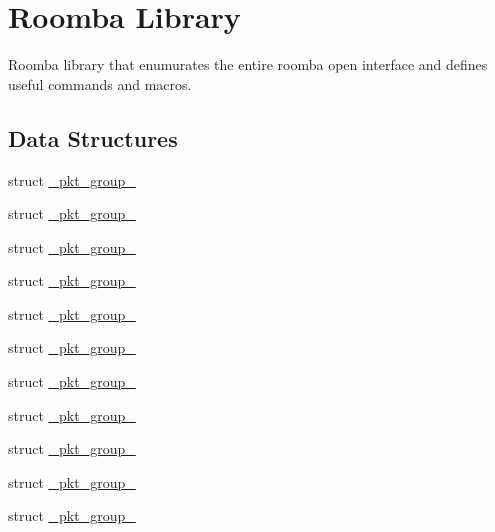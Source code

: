 \hypertarget{group__roomba-lib}{}\section{Roomba Library}
\label{group__roomba-lib}


Roomba library that enumurates the entire roomba open interface and defines useful commands and macros.  


\subsection*{Data Structures}
\begin{DoxyCompactItemize}
\item 
struct \hyperlink{struct__pkt__group__0}{\+\_\+pkt\+\_\+group\+\_}
\item 
struct \hyperlink{struct__pkt__group__1}{\+\_\+pkt\+\_\+group\+\_}
\item 
struct \hyperlink{struct__pkt__group__2}{\+\_\+pkt\+\_\+group\+\_}
\item 
struct \hyperlink{struct__pkt__group__3}{\+\_\+pkt\+\_\+group\+\_}
\item 
struct \hyperlink{struct__pkt__group__4}{\+\_\+pkt\+\_\+group\+\_}
\item 
struct \hyperlink{struct__pkt__group__5}{\+\_\+pkt\+\_\+group\+\_}
\item 
struct \hyperlink{struct__pkt__group__6}{\+\_\+pkt\+\_\+group\+\_}
\item 
struct \hyperlink{struct__pkt__group__100}{\+\_\+pkt\+\_\+group\+\_}
\item 
struct \hyperlink{struct__pkt__group__101}{\+\_\+pkt\+\_\+group\+\_}
\item 
struct \hyperlink{struct__pkt__group__106}{\+\_\+pkt\+\_\+group\+\_}
\item 
struct \hyperlink{struct__pkt__group__107}{\+\_\+pkt\+\_\+group\+\_}
\end{DoxyCompactItemize}
